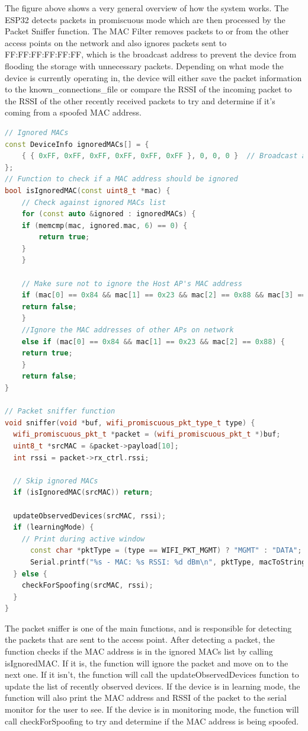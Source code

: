 \documentclass[letterpaper, 11pt]{article}
\begin{document}
The figure above shows a very general overview of how the system works. The ESP32 detects packets in promiscuous mode which are then processed by the Packet Sniffer function. The MAC 
Filter removes packets to or from the other access points on the network and also ignores packets sent to FF:FF:FF:FF:FF:FF, which is the broadcast address to prevent the device from
flooding the storage with unnecessary packets. Depending on what mode the device is currently operating in, the device will either save the packet information to the known\_connections\_file 
or compare the RSSI of the incoming packet to the RSSI of the other recently received packets to try and determine if it's coming from a spoofed MAC address.

\newpage
\begin{lstlisting}[language=C++, caption=Packet Sniffer and MAC Filter, label=lst:main_code]
// Ignored MACs
const DeviceInfo ignoredMACs[] = {
    { { 0xFF, 0xFF, 0xFF, 0xFF, 0xFF, 0xFF }, 0, 0, 0 }  // Broadcast address
};
// Function to check if a MAC address should be ignored
bool isIgnoredMAC(const uint8_t *mac) {
    // Check against ignored MACs list
    for (const auto &ignored : ignoredMACs) {
    if (memcmp(mac, ignored.mac, 6) == 0) {
        return true;
    }
    }

    // Make sure not to ignore the Host AP's MAC address
    if (mac[0] == 0x84 && mac[1] == 0x23 && mac[2] == 0x88 && mac[3] == 0x7B && mac[4] == 0x90 && mac[5] == 0xA0) { 
    return false;
    } 
    //Ignore the MAC addresses of other APs on network
    else if (mac[0] == 0x84 && mac[1] == 0x23 && mac[2] == 0x88) {
    return true;
    }
    return false;
}

// Packet sniffer function
void sniffer(void *buf, wifi_promiscuous_pkt_type_t type) {
  wifi_promiscuous_pkt_t *packet = (wifi_promiscuous_pkt_t *)buf;
  uint8_t *srcMAC = &packet->payload[10];
  int rssi = packet->rx_ctrl.rssi;

  // Skip ignored MACs
  if (isIgnoredMAC(srcMAC)) return;
  
  updateObservedDevices(srcMAC, rssi);
  if (learningMode) {
    // Print during active window
      const char *pktType = (type == WIFI_PKT_MGMT) ? "MGMT" : "DATA";
      Serial.printf("%s - MAC: %s RSSI: %d dBm\n", pktType, macToString(srcMAC).c_str(), rssi);
  } else {
    checkForSpoofing(srcMAC, rssi);
  }
} 
\end{lstlisting}
The packet sniffer is one of the main functions, and is responsible for detecting the packets that are sent to the access point. After detecting a packet, the function checks if the MAC address
is in the ignored MACs list by calling isIgnoredMAC. If it is, the function will ignore the packet and move on to the next one. If it isn't, the function will call the updateObservedDevices 
function to update the list of recently observed devices. If the device is in learning mode, the function will also print the MAC address and RSSI of the packet to the serial monitor for the 
user to see. If the device is in monitoring mode, the function will call checkForSpoofing to try and determine if the MAC address is being spoofed.
\end{document}

